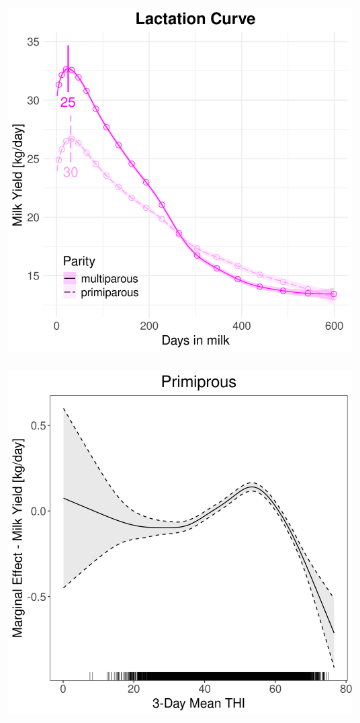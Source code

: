 \begin{figure}[H]
\begin{subfigure}[b]{0.45\textwidth}
        \includegraphics[width=\textwidth]{thesis/figures/models/milk/full/sf_milk_full/sf_milk_full_marginal_dim_milk_combined.png}
    \end{subfigure}
    \begin{subfigure}[b]{0.45\textwidth}
        \centering
        \includegraphics[width=\textwidth]{thesis/figures/models/milk/full/sf_milk_full/sf_milk_full_marginal_thi_milk_primi.png}

\end{subfigure}
\end{figure}
